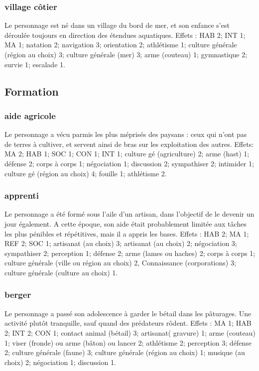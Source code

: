 \documentclass[10pt,a4paper,twocolumn]{book}
\begin{document}
\subsubsection{village côtier}
Le personnage est né dans un village du bord de mer, et son enfance s’est déroulée toujours en direction des étendues aquatiques.
Effets : HAB 2; INT 1; MA 1; natation 2; navigation 3; orientation 2; athlétisme 1; culture générale (région au choix) 3; culture générale (mer) 3; arme (couteau) 1; gymnastique 2; survie 1; escalade 1.

\subsection{Formation}
\subsubsection{aide agricole}
Le personnage a vécu parmis les plus méprisés des paysans : ceux qui n’ont pas de terres à cultiver, et servent ainsi de bras sur les exploitation des autres.
Effets: MA 2; HAB 1; SOC 1; CON 1; INT 1; culture gé (agriculture) 2; arme (hast) 1; défense 2; corps à corps 1; négociation 1; discussion 2; sympathiser 2; intimider 1; culture gé (région au choix) 4; fouille 1; athlétisme 2.
\subsubsection{apprenti}
Le personnage a été formé sous l’aile d’un artisan, dans l’objectif de le devenir un jour également. A cette époque, son aide était probablement limitée aux tâches les plus pénibles et répétitives, mais il a appris les bases.
Effets : HAB 2; MA 1; REF 2; SOC 1; artisanat (au choix) 3; artisanat (au choix) 2; négociation 3; sympathiser 2; perception 1; défense 2; arme (lames ou haches) 2; corps à corps 1; culture générale (ville ou région au choix) 2, Connaissance (corporations) 3; culture générale (culture au choix) 1.
\subsubsection{berger}
Le personnage a passé son adolescence à garder le bétail dans les pâturages. Une activité plutôt tranquille, sauf quand des prédateurs rôdent.
Effets : MA 1; HAB 2; INT 2; CON 1; contact animal (bétail) 3; artisanat( gravure) 1; arme (couteau) 1; viser (fronde) ou arme (bâton) ou lancer 2; athlétisme 2; perception 3; défense 2; culture générale (faune) 3; culture générale (région au choix) 1; musique (au choix) 2; négociation 1; discussion 1.
\end{document}
